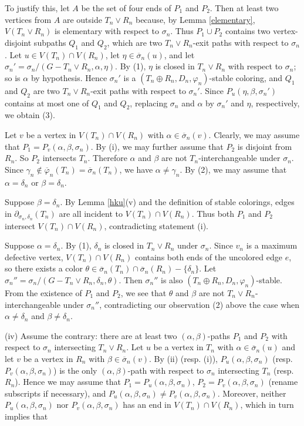 \documentclass[11pt]{article}
\newcommand{\phibar}{\overline{\varphi}}
\begin{document}
To justify this, let $A$ be the set of four ends of $P_1$ and $P_2$. Then at least two vertices from $A$ are 
outside $T_n\vee R_n$ because, by Lemma \ref{elementary}, $V(T_n\vee R_n)$ is elementary with respect to $\sigma_n$. 
Thus $P_1 \cup P_2$ contains two vertex-disjoint subpaths $Q_1$ and $Q_2$, which are two $T_n\vee R_n$-exit 
paths with respect to $\sigma_n$. Let $u \in V(T_n) \cap V(R_n)$, let $\eta \in \overline{\sigma}_n(u)$, and let $\sigma_n'=
\sigma_n/(G-T_n\vee R_n,\alpha, \eta)$. By (1), $\eta$ is closed in $T_n\vee R_n$ with respect to $\sigma_n$; so is $\alpha$ by hypothesis. Hence $\sigma_n'$ is a $(T_n \oplus R_n, D_n,\varphi_n)$-stable coloring, and $Q_1$ and $Q_2$ are two $T_n\vee R_n$-exit paths with respect to $\sigma_n'$. Since $P_u(\eta, \beta, \sigma_n')$ contains at most one of $Q_1$ and $Q_2$, replacing
$\sigma_n$ and $\alpha$ by $\sigma_n'$ and $\eta$, respectively, we obtain (3). 

Let $v$ be a vertex in $V(T_n)\cap V(R_n)$ with $\alpha\in \overline{\sigma}_n(v)$. Clearly, we may assume that $P_1=
P_v(\alpha,\beta,\sigma_n)$. By (i), we may further assume that $P_2$ is disjoint from $R_n$. So $P_2$ intersects $T_n$.
Therefore $\alpha$ and $\beta$ are not $T_n$-interchangeable under $\sigma_n$. Since $\gamma_n\notin\phibar_n(T_n)=
\overline{\sigma}_n(T_n)$, we have $\alpha\neq\gamma_n$. By (2), we may assume that $\alpha = \delta_n$ or $\beta=\delta_n$.

Suppose $\beta=\delta_n$. By Lemma \ref{hku}(v) and the definition of stable colorings, edges in $\partial_{\sigma_n, \delta_n}(T_n)$ 
are all incident to $V(T_n)\cap V(R_n)$. Thus both $P_1$ and $P_2$ intersect $V(T_n)\cap V(R_n)$, contradicting statement (i).

Suppose $\alpha=\delta_n$. By (1), $\delta_n$ is closed in $T_n\vee R_n$ under $\sigma_n$. Since $v_n$ is a maximum defective vertex, $V(T_n) \cap V(R_n)$ 
contains both ends of the uncolored edge $e$, so there exists a color $\theta \in \overline{\sigma}_n(T_n) \cap \overline{\sigma}_n(R_n)-\{\delta_n\}$. Let $\sigma_n''= \sigma_n/(G-T_n\vee R_n,\delta_n, \theta)$. Then $\sigma_n''$ is also 
$(T_n\oplus R_n, D_n,\varphi_n)$-stable. From the existence of $P_1$ and $P_2$, we see that $\theta$ and $\beta$ are not $T_n\vee R_n$-interchangeable under $\sigma_n''$, contradicting our observation (2) above the case when $\alpha \ne \delta_n$ and
$\beta \ne \delta_n$. 

(iv) Assume the contrary: there are at least two $(\alpha,\beta)$-paths $P_1$ and $P_2$ with respect to $\sigma_n$ 
intersecting $T_n \vee R_n$. Let $u$ be a vertex in $T_n$ with $\alpha \in \overline{\sigma}_n (u)$ and let $v$ be 
a vertex in $R_n$ with $\beta \in \overline{\sigma}_n(v)$. By (ii) (resp. (i)), $P_u(\alpha,\beta,\sigma_n)$
(resp.  $P_v(\alpha,\beta,\sigma_n)$) is the only $(\alpha,\beta)$-path with respect to $\sigma_n$ intersecting $T_n$ 
(resp. $R_n$). Hence we may assume that $P_1=P_u(\alpha,\beta,\sigma_n)$, $P_2=P_v(\alpha, \beta,\sigma_n)$ (rename subscripts if 
necessary), and $P_u(\alpha,\beta,\sigma_n) \ne P_v(\alpha,\beta,\sigma_n)$. Moreover, neither $P_u(\alpha,\beta,\sigma_n)$ 
nor $P_v(\alpha, \beta,\sigma_n)$ has an end in $V(T_n) \cap V(R_n)$, which in turn implies that    
\end{document}
